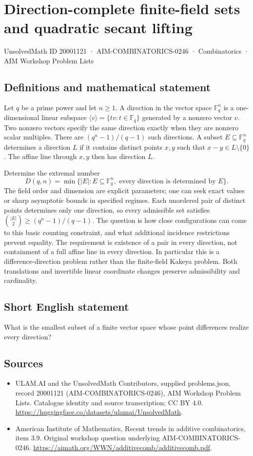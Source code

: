 \documentclass[11pt,a4paper]{article}
\begin{document}
\section*{Direction-complete finite-field sets and quadratic secant lifting}\label{20001121}
{\small UnsolvedMath ID 20001121 · AIM-COMBINATORICS-0246 · Combinatorics · AIM Workshop Problem Lists}
\subsection{Definitions and mathematical statement}
Let $q$ be a prime power and let $n\geq1$.
A direction in the vector space $\mathbb F_q^n$ is a one-dimensional linear subspace
$\langle v\rangle=\{tv:t\in\mathbb F_q\}$ generated by a nonzero vector $v$.
Two nonzero vectors specify the same direction exactly when they are nonzero scalar multiples.
There are $(q^n-1)/(q-1)$ such directions.
A subset $E\subseteq\mathbb F_q^n$ determines a direction $L$ if it contains distinct points $x,y$ such that $x-y\in L\setminus\{0\}$.
The affine line through $x,y$ then has direction $L$.

Determine the extremal number
\[
 D(q,n)=\min\{|E|:E\subseteq\mathbb F_q^n,
    \text{ every direction is determined by }E\}.
\]
The field order and dimension are explicit parameters; one can seek exact values or sharp asymptotic bounds in specified regimes.
Each unordered pair of distinct points determines only one direction, so every admissible set satisfies
$\binom{|E|}{2}\geq(q^n-1)/(q-1)$.
The question is how close configurations can come to this basic counting constraint, and what additional incidence restrictions prevent equality.
The requirement is existence of a pair in every direction, not containment of a full affine line in every direction.
In particular this is a difference-direction problem rather than the finite-field Kakeya problem.
Both translations and invertible linear coordinate changes preserve admissibility and cardinality.
\subsection{Short English statement}
What is the smallest subset of a finite vector space whose point differences realize every direction?
\subsection{Sources}
\begin{itemize}
\item[S1] ULAM.AI and the UnsolvedMath Contributors, supplied problems.json, record 20001121 (AIM-COMBINATORICS-0246), AIM Workshop Problem Lists. Catalogue identity and source transcription; CC BY 4.0.
\url{https://huggingface.co/datasets/ulamai/UnsolvedMath}.
\item[S2] American Institute of Mathematics, Recent trends in additive combinatorics, item 3.9. Original workshop question underlying AIM-COMBINATORICS-0246.
\url{https://aimath.org/WWN/additivecomb/additivecomb.pdf}.
\end{itemize}
\end{document}
